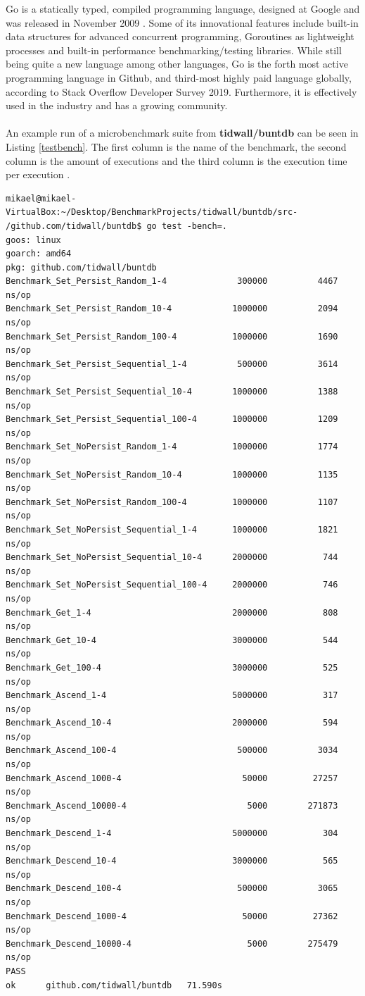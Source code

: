 \documentclass{seal_thesis}
\begin{document}
Go is a statically typed, compiled programming language, designed at Google and was released in November 2009 \cite{go}. Some of its innovational features include built-in data structures for advanced concurrent programming, Goroutines as lightweight processes and built-in performance benchmarking/testing libraries. While still being quite a new language among other languages, Go is the forth most active programming language in Github, and third-most highly paid language globally, according to Stack Overflow Developer Survey 2019\cite{stackoverflowdev}. Furthermore, it is effectively used in the industry and has a growing community.\\
\\
An example run of a microbenchmark suite from \textbf{tidwall/buntdb} \cite{tidwall/buntdb} can be seen in Listing \ref{testbench}. The first column is the name of the benchmark, the second column is the amount of executions and the third column is the execution time per execution \cite{gobench}.
\begin{lstlisting}[caption=Example microbenchmark suite execution from \cite{tidwall/buntdb}., label={testbench}, frame=single, breaklines=false]
mikael@mikael-VirtualBox:~/Desktop/BenchmarkProjects/tidwall/buntdb/src-
/github.com/tidwall/buntdb$ go test -bench=.
goos: linux
goarch: amd64
pkg: github.com/tidwall/buntdb
Benchmark_Set_Persist_Random_1-4           	  300000	      4467 ns/op
Benchmark_Set_Persist_Random_10-4          	 1000000	      2094 ns/op
Benchmark_Set_Persist_Random_100-4         	 1000000	      1690 ns/op
Benchmark_Set_Persist_Sequential_1-4       	  500000	      3614 ns/op
Benchmark_Set_Persist_Sequential_10-4      	 1000000	      1388 ns/op
Benchmark_Set_Persist_Sequential_100-4     	 1000000	      1209 ns/op
Benchmark_Set_NoPersist_Random_1-4         	 1000000	      1774 ns/op
Benchmark_Set_NoPersist_Random_10-4        	 1000000	      1135 ns/op
Benchmark_Set_NoPersist_Random_100-4       	 1000000	      1107 ns/op
Benchmark_Set_NoPersist_Sequential_1-4     	 1000000	      1821 ns/op
Benchmark_Set_NoPersist_Sequential_10-4    	 2000000	       744 ns/op
Benchmark_Set_NoPersist_Sequential_100-4   	 2000000	       746 ns/op
Benchmark_Get_1-4                          	 2000000	       808 ns/op
Benchmark_Get_10-4                         	 3000000	       544 ns/op
Benchmark_Get_100-4                        	 3000000	       525 ns/op
Benchmark_Ascend_1-4                       	 5000000	       317 ns/op
Benchmark_Ascend_10-4                      	 2000000	       594 ns/op
Benchmark_Ascend_100-4                     	  500000	      3034 ns/op
Benchmark_Ascend_1000-4                    	   50000	     27257 ns/op
Benchmark_Ascend_10000-4                   	    5000	    271873 ns/op
Benchmark_Descend_1-4                      	 5000000	       304 ns/op
Benchmark_Descend_10-4                     	 3000000	       565 ns/op
Benchmark_Descend_100-4                    	  500000	      3065 ns/op
Benchmark_Descend_1000-4                   	   50000	     27362 ns/op
Benchmark_Descend_10000-4                  	    5000	    275479 ns/op
PASS
ok  	github.com/tidwall/buntdb	71.590s
\end{lstlisting}
\end{document}
